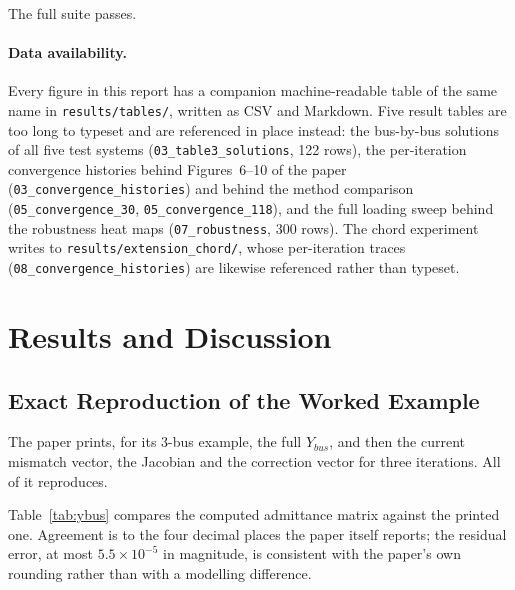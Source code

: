 \documentclass[sigconf,nonacm]{acmart}
\begin{document}
\noindent The full suite passes.

\paragraph{Data availability.}
Every figure in this report has a companion machine-readable table of the same
name in \texttt{results/tables/}, written as CSV and Markdown. Five result
tables are too long to typeset and are referenced in place instead: the bus-by-bus
solutions of all five test systems (\texttt{03\_table3\_solutions}, 122 rows),
the per-iteration convergence histories behind Figures~6--10 of the paper
(\texttt{03\_convergence\_histories}) and behind the method comparison
(\texttt{05\_convergence\_30}, \texttt{05\_convergence\_118}), and the full
loading sweep behind the robustness heat maps (\texttt{07\_robustness}, 300
rows). The chord experiment writes to \texttt{results/extension\_chord/}, whose
per-iteration traces (\texttt{08\_convergence\_histories}) are likewise
referenced rather than typeset.

\section{Results and Discussion}

\subsection{Exact Reproduction of the Worked Example}
\label{sec:res-worked}
The paper prints, for its 3-bus example, the full $Y_{bus}$, and then the
current mismatch vector, the Jacobian and the correction vector for three
iterations. All of it reproduces.

Table~\ref{tab:ybus} compares the computed admittance matrix against the printed
one. Agreement is to the four decimal places the paper itself reports; the
residual error, at most $5.5\times10^{-5}$ in magnitude, is consistent with the
paper's own rounding rather than with a modelling difference.
\end{document}
